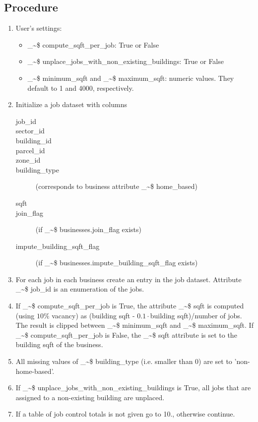 \documentclass[11pt]{article}
\makeatletter
\newcommand\code{\bgroup\@makeother\_\@makeother\~\@makeother\$\@codex}
\def\@codex#1{{\normalfont\ttfamily\hyphenchar\font=-1 #1}\egroup}
\makeatother
\begin{document}
\subsection{Procedure}
%
\begin{enumerate}
\item User's settings:
\begin{itemize}
\item \code{compute_sqft_per_job}: True or False
\item \code{unplace_jobs_with_non_existing_buildings}: True or False
\item \code{minimum_sqft} and \code{maximum_sqft}: numeric values. They default to 1 and 4000, respectively.
\end{itemize}
\item Initialize a job dataset with columns
\begin{description}
\item[job\_id]
\item[sector\_id]
\item[building\_id]
\item[parcel\_id]
\item[zone\_id]
\item[building\_type] (corresponds to business attribute \code{home_based})
\item[sqft]
\item[join\_flag] (if \code{businesses.join_flag} exists)
\item[impute\_building\_sqft\_flag] (if \code{businesses.impute_building_sqft_flag} exists)
\end{description}
\item For each job in each business create an entry in the job dataset. Attribute \code{job_id} is an enumeration of the jobs.
\item If \code{compute_sqft_per_job} is True, the attribute \code{sqft} is computed (using $10\%$ vacancy) as (building sqft - $0.1\cdot$building sqft)/number of jobs. The result is clipped between \code{minimum_sqft} and \code{maximum_sqft}. If \code{compute_sqft_per_job} is False, the  \code{sqft} attribute is set to the building sqft of the business.
\item All missing values of \code{building_type} (i.e. smaller than 0) are set to 'non-home-based'.
\item If \code{unplace_jobs_with_non_existing_buildings} is True, all jobs that are assigned to a non-existing building are unplaced. 
\item If a table of job control totals is not given go to 10., otherwise continue.

\end{enumerate}
\end{document}
